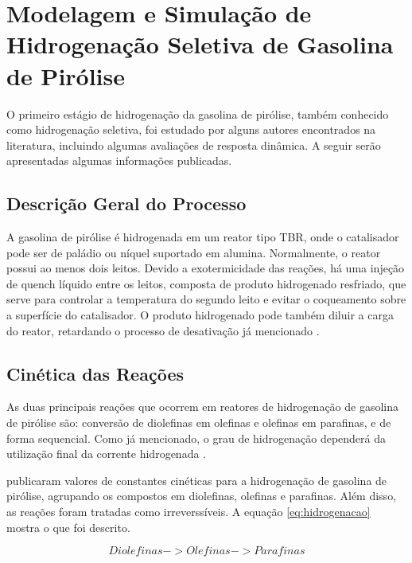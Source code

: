 \section {Modelagem e Simulação de Hidrogenação Seletiva de Gasolina de Pirólise}
\label{sec:hidrogenacaopygas}

O primeiro estágio de hidrogenação da gasolina de pirólise, também conhecido como hidrogenação seletiva, foi estudado por alguns autores encontrados na literatura, incluindo algumas avaliações de resposta dinâmica. A seguir serão apresentadas algumas informações publicadas.

\subsection{Descrição Geral do Processo} \label{sec:descricaogeral}

A gasolina de pirólise é hidrogenada em um reator tipo TBR, onde o catalisador pode ser de paládio ou níquel suportado em alumina. Normalmente, o reator possui ao menos dois leitos. Devido a exotermicidade das reações, há uma injeção de quench líquido entre os leitos, composta de produto hidrogenado resfriado, que serve para controlar a temperatura do segundo leito e evitar o coqueamento sobre a superfície do catalisador. O produto hidrogenado pode também diluir a carga do reator, retardando o processo de desativação já mencionado \cite{Cheng1986,Derrien1986,Arpornwichanop2002,Rojas2014a}.

\subsection{Cinética das Reações} \label{sec:cineticadasreacoes}

As duas principais reações que ocorrem em reatores de hidrogenação de gasolina de pirólise são: conversão de diolefinas em olefinas e olefinas em parafinas, e de forma sequencial. Como já mencionado, o grau de hidrogenação dependerá da utilização final da corrente hidrogenada . 

 publicaram valores de constantes cinéticas para a hidrogenação de gasolina de pirólise, agrupando os compostos em diolefinas, olefinas e parafinas. Além disso, as reações foram tratadas como irreverssíveis. A equação \autoref{eq:hidrogenacao} mostra o que foi descrito.

\begin{equation}
Diolefinas -> Olefinas -> Parafinas
\label{eq:hidrogenacao}
\end{equation}

